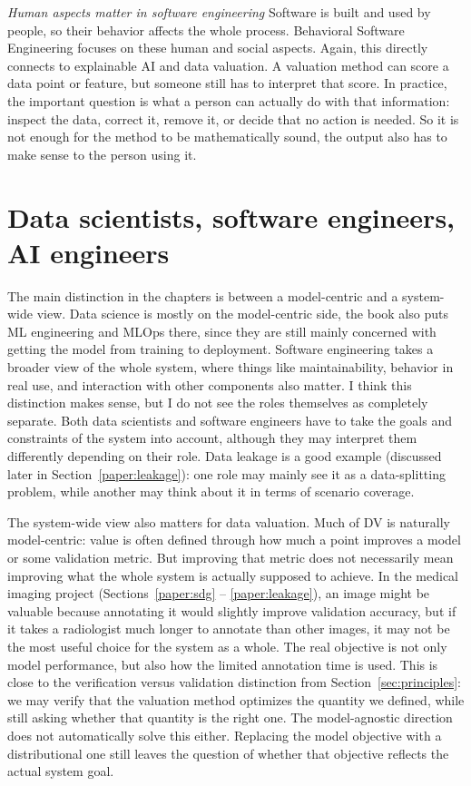 \documentclass[11pt,a4paper]{article}
\begin{document}
\emph{Human aspects matter in software engineering} Software is built and used by people, so their behavior affects the whole process. Behavioral Software Engineering focuses on these human and social aspects. Again, this directly connects to explainable AI and data valuation. A valuation method can score a data point or feature, but someone still has to interpret that score. In practice, the important question is what a person can actually do with that information: 
inspect the data, correct it, remove it, or decide that no action is needed. So it is not enough for the method to be mathematically sound, the output also has to make sense to the person using it. 

\section{Data scientists, software engineers, AI engineers}


The main distinction in the chapters is between a model-centric and a system-wide view. Data science is mostly on the model-centric side, the book also puts ML engineering and MLOps there, since they are still mainly concerned with getting the model from training to deployment. Software engineering takes a broader view of the whole system, where things like maintainability, behavior in real use, and interaction with other components also matter. I think this distinction makes sense, but I do not see the roles themselves as completely separate. Both data scientists and software engineers have to take the goals and constraints of the system into account, although they may interpret them differently depending on their role. Data leakage is a good example (discussed later in Section~\ref{paper:leakage}): one role may mainly see it as a data-splitting problem, while another may think about it in terms of scenario coverage.

The system-wide view also matters for data valuation. Much of DV is naturally model-centric: value is often defined through how much a point improves a model or some validation metric. But improving that metric does not necessarily mean improving what the whole system is actually supposed to achieve. In the medical imaging project (Sections~\ref{paper:sdg} -- \ref{paper:leakage}), an image might be valuable because annotating it would slightly improve validation accuracy, but if it takes a radiologist much longer to annotate than other images, it may not be the most useful choice for the system as a whole. The real objective is not only model performance, but also how the limited annotation time is used. This is close to the verification versus validation distinction from Section~\ref{sec:principles}: we may verify that the valuation method optimizes the quantity we defined, while still asking whether that quantity is the right one. The model-agnostic direction does not automatically solve this either. Replacing the model objective with a distributional one still leaves the question of whether that objective reflects the actual system goal.
\end{document}
